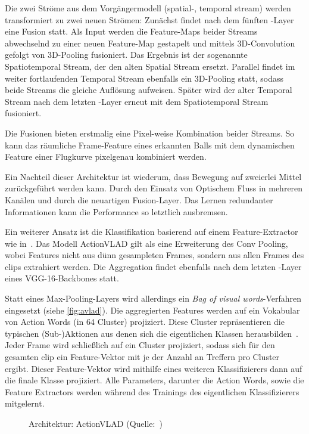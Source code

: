 Die zwei Ströme aus dem Vorgängermodell (spatial-, temporal stream) werden transformiert zu zwei neuen Strömen:
Zunächst findet nach dem fünften \conv-Layer eine Fusion statt.
Als Input werden die Feature-Maps beider Streams abwechselnd zu einer neuen Feature-Map gestapelt und mittels 3D-Convolution gefolgt von 3D-Pooling fusioniert.
Das Ergebnis ist der sogenannte Spatiotemporal Stream, der den alten Spatial Stream ersetzt.
Parallel findet im weiter fortlaufenden Temporal Stream ebenfalls ein 3D-Pooling statt, sodass beide Streams die gleiche Auflösung aufweisen.
Später wird der alter Temporal Stream nach dem letzten \fc-Layer erneut mit dem Spatiotemporal Stream fusioniert.

Die Fusionen bieten erstmalig eine Pixel-weise Kombination beider Streams.
So kann \zB das räumliche Frame-Feature eines erkannten Balls mit dem dynamischen Feature einer Flugkurve pixelgenau kombiniert werden.

Ein Nachteil dieser Architektur ist wiederum, dass Bewegung auf zweierlei Mittel zurückgeführt werden kann.
Durch den Einsatz von Optischem Fluss in mehreren Kanälen und durch die neuartigen Fusion-Layer.
Das Lernen redundanter Informationen kann die Performance so letztlich ausbremsen.

Ein weiterer Ansatz ist die Klassifikation basierend auf einem Feature-Extractor wie in~\cite{Girdhar17}.
Das Modell ActionVLAD gilt als eine Erweiterung des Conv Pooling, wobei Features nicht aus dünn gesampleten Frames, sondern aus allen Frames des \glspl{clip} extrahiert werden.
Die Aggregation findet ebenfalls nach dem letzten \conv-Layer eines VGG-16-Backbones statt.

Statt eines Max-Pooling-Layers wird allerdings ein \emph{Bag of visual words}-Verfahren eingesetzt (siehe \autoref{fig:avlad}).
Die aggregierten Features werden auf ein Vokabular von Action Words (in 64 Cluster) projiziert.
Diese Cluster repräsentieren die typischen (Sub-)Aktionen aus denen sich die eigentlichen Klassen herausbilden~\cite{Ghosh18}.
Jeder Frame wird schließlich auf ein Cluster projiziert, sodass sich für den gesamten \gls{clip} ein Feature-Vektor mit je der Anzahl an Treffern pro Cluster ergibt.
Dieser Feature-Vektor wird mithilfe eines weiteren Klassifizierers dann auf die finale Klasse projiziert.
Alle Parameters, darunter die Action Words, sowie die Feature Extractors werden während des Trainings des eigentlichen Klassifizierers mitgelernt.

\begin{figure}[h!]
    \centering
    \caption{Architektur: ActionVLAD (Quelle:~\cite{Girdhar17})}
    \label{fig:avlad}
\end{figure}


